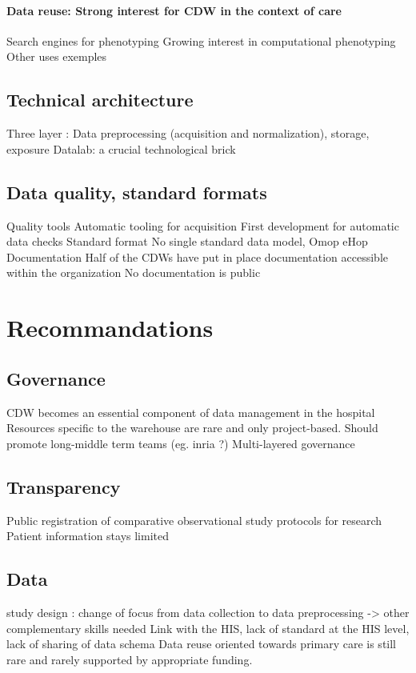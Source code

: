 \documentclass{report}
\begin{document}
\paragraph{Data reuse: Strong interest for CDW in the context of care}
Search engines for phenotyping
Growing interest in computational phenotyping
Other uses exemples
\subsection{Technical architecture}
Three layer : Data preprocessing (acquisition and normalization), storage, exposure
Datalab: a crucial technological brick
\subsection{Data quality, standard formats}
Quality tools
Automatic tooling for acquisition
First development for automatic data checks
Standard format
No single standard data model,
Omop
eHop
Documentation
Half of the CDWs have put in place documentation accessible within the organization
No documentation is public

\section{Recommandations}

\subsection{Governance}
CDW becomes an essential component of data management in the hospital
Resources specific to the warehouse are rare and only project-based. Should promote long-middle term teams (eg. inria ?)
Multi-layered governance
\subsection{Transparency}
Public registration of comparative observational study protocols for research
Patient information stays limited
\subsection{Data}
study design : change of focus from data collection to data preprocessing -> other complementary skills needed
Link with the HIS, lack of standard at the HIS level, lack of sharing of data schema
Data reuse oriented towards primary care is still rare and rarely supported by appropriate funding.
\end{document}
